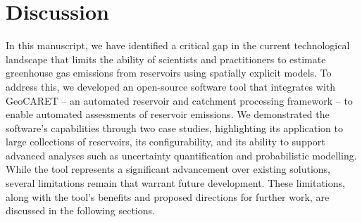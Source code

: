 \documentclass[final,1p,times]{elsarticle}
\begin{document}


\section{Discussion}
\label{sec:discussion}

In this manuscript, we have identified a critical gap in the current technological landscape that limits the ability of scientists and practitioners to estimate greenhouse gas emissions from reservoirs using spatially explicit models.
To address this, we developed an open-source software tool that integrates with GeoCARET -- an automated reservoir and catchment processing framework -- to enable automated assessments of reservoir emissions.
We demonstrated the software’s capabilities through two case studies, highlighting its application to large collections of reservoirs, its configurability, and its ability to support advanced analyses such as uncertainty quantification and probabilistic modelling.
While the tool represents a significant advancement over existing solutions, several limitations remain that warrant future development.
These limitations, along with the tool's benefits and proposed directions for further work, are discussed in the following sections.
\end{document}
